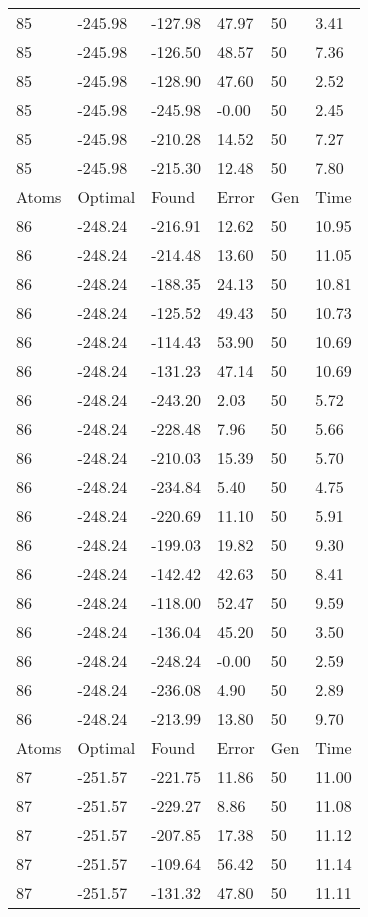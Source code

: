 \documentclass{report}
\begin{document}
\begin{appendix}
\begin{longtable}{llllll}
85 & -245.98 & -127.98 & 47.97 & 50 & 3.41 \\
85 & -245.98 & -126.50 & 48.57 & 50 & 7.36 \\
85 & -245.98 & -128.90 & 47.60 & 50 & 2.52 \\
85 & -245.98 & -245.98 & -0.00 & 50 & 2.45 \\
85 & -245.98 & -210.28 & 14.52 & 50 & 7.27 \\
85 & -245.98 & -215.30 & 12.48 & 50 & 7.80 \\
Atoms & Optimal & Found & Error & Gen & Time \\
86 & -248.24 & -216.91 & 12.62 & 50 & 10.95 \\
86 & -248.24 & -214.48 & 13.60 & 50 & 11.05 \\
86 & -248.24 & -188.35 & 24.13 & 50 & 10.81 \\
86 & -248.24 & -125.52 & 49.43 & 50 & 10.73 \\
86 & -248.24 & -114.43 & 53.90 & 50 & 10.69 \\
86 & -248.24 & -131.23 & 47.14 & 50 & 10.69 \\
86 & -248.24 & -243.20 & 2.03 & 50 & 5.72 \\
86 & -248.24 & -228.48 & 7.96 & 50 & 5.66 \\
86 & -248.24 & -210.03 & 15.39 & 50 & 5.70 \\
86 & -248.24 & -234.84 & 5.40 & 50 & 4.75 \\
86 & -248.24 & -220.69 & 11.10 & 50 & 5.91 \\
86 & -248.24 & -199.03 & 19.82 & 50 & 9.30 \\
86 & -248.24 & -142.42 & 42.63 & 50 & 8.41 \\
86 & -248.24 & -118.00 & 52.47 & 50 & 9.59 \\
86 & -248.24 & -136.04 & 45.20 & 50 & 3.50 \\
86 & -248.24 & -248.24 & -0.00 & 50 & 2.59 \\
86 & -248.24 & -236.08 & 4.90 & 50 & 2.89 \\
86 & -248.24 & -213.99 & 13.80 & 50 & 9.70 \\
Atoms & Optimal & Found & Error & Gen & Time \\
87 & -251.57 & -221.75 & 11.86 & 50 & 11.00 \\
87 & -251.57 & -229.27 & 8.86 & 50 & 11.08 \\
87 & -251.57 & -207.85 & 17.38 & 50 & 11.12 \\
87 & -251.57 & -109.64 & 56.42 & 50 & 11.14 \\
87 & -251.57 & -131.32 & 47.80 & 50 & 11.11 \\

\end{longtable}
\end{appendix}
\end{document}
